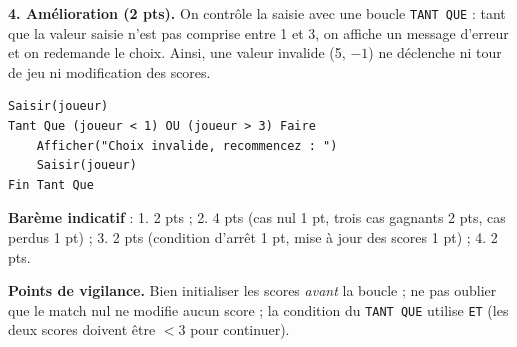 \documentclass[11pt]{article}
\begin{document}
\begin{corrige}
\textbf{4. Amélioration (2 pts).} On contrôle la saisie avec une boucle \texttt{TANT QUE} : tant que la valeur saisie n'est pas comprise entre 1 et 3, on affiche un message d'erreur et on redemande le choix. Ainsi, une valeur invalide (5, $-1$) ne déclenche ni tour de jeu ni modification des scores.
\begin{lstlisting}
Saisir(joueur)
Tant Que (joueur < 1) OU (joueur > 3) Faire
    Afficher("Choix invalide, recommencez : ")
    Saisir(joueur)
Fin Tant Que
\end{lstlisting}

\textbf{Barème indicatif} : 1. 2 pts ; 2. 4 pts (cas nul 1 pt, trois cas gagnants 2 pts, cas perdus 1 pt) ; 3. 2 pts (condition d'arrêt 1 pt, mise à jour des scores 1 pt) ; 4. 2 pts.

\textbf{Points de vigilance.} Bien initialiser les scores \emph{avant} la boucle ; ne pas oublier que le match nul ne modifie aucun score ; la condition du \texttt{TANT QUE} utilise \texttt{ET} (les deux scores doivent être $< 3$ pour continuer).
\end{corrige}
\end{document}
